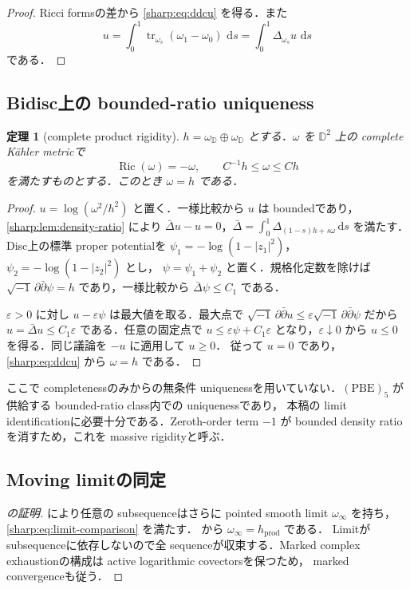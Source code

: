 \documentclass[a4paper,11pt]{ltjsarticle}
\numberwithin{equation}{section}
\theoremstyle{plain}
\newtheorem{theorem}{定理}[section]
\theoremstyle{definition}
\theoremstyle{remark}
\newcommand{\eps}{\varepsilon}\newcommand{\dd}{\,\mathrm d}\newcommand{\ddc}{\sqrt{-1}\,\partial\bar\partial}
\newcommand{\Ric}{\operatorname{Ric}}\newcommand{\tr}{\operatorname{tr}}\newcommand{\osc}{\operatorname{osc}}\newcommand{\vol}{\operatorname{Vol}}
\begin{document}
\begin{proof}
Ricci formsの差から \eqref{sharp:eq:ddcu} を得る．また
\[
 u=\int_0^1\tr_{\omega_s}(\omega_1-\omega_0)\,\dd s
  =\int_0^1\Delta_{\omega_s}u\,\dd s
\]
である．
\end{proof}

\subsection{Bidisc上の bounded-ratio uniqueness}

\begin{theorem}[complete product rigidity]\label{sharp:thm:complete-product-rigidity}
$h=\omega_{\mathbb D}\oplus\omega_{\mathbb D}$ とする．$\omega$ を $\mathbb D^2$ 上の complete Kähler metricで
\[
 \Ric(\omega)=-\omega,\qquad C^{-1}h\le\omega\le Ch
\]
を満たすものとする．このとき $\omega=h$ である．
\end{theorem}

\begin{proof}
$u=\log(\omega^2/h^2)$ と置く．一様比較から $u$ は boundedであり，\cref{sharp:lem:density-ratio} により
$\bar\Delta u-u=0$，$\bar\Delta=\int_0^1\Delta_{(1-s)h+s\omega}\dd s$ を満たす．
Disc上の標準 proper potentialを $\psi_1=-\log(1-|z_1|^2)$，$\psi_2=-\log(1-|z_2|^2)$ とし，
$\psi=\psi_1+\psi_2$ と置く．規格化定数を除けば $\ddc\psi=h$ であり，一様比較から
$\bar\Delta\psi\le C_1$ である．

$\eps>0$ に対し $u-\eps\psi$ は最大値を取る．最大点で $\ddc u\le\eps\ddc\psi$ だから
$u=\bar\Delta u\le C_1\eps$ である．任意の固定点で
$u\le\eps\psi+C_1\eps$ となり，$\eps\downarrow0$ から $u\le0$ を得る．同じ議論を $-u$ に適用して $u\ge0$．
従って $u=0$ であり，\eqref{sharp:eq:ddcu} から $\omega=h$ である．
\end{proof}

\begin{remark}
ここで completenessのみからの無条件 uniquenessを用いていない．$\mathrm{(PBE)}_5$ が供給する bounded-ratio class内での uniquenessであり，
本稿の limit identificationに必要十分である．Zeroth-order term $-1$ が bounded density ratioを消すため，これを massive rigidityと呼ぶ．
\end{remark}

\subsection{Moving limitの同定}

\begin{proof}[ の証明]
 により任意の subsequenceはさらに pointed smooth limit $\omega_\infty$ を持ち，
\eqref{sharp:eq:limit-comparison} を満たす． から $\omega_\infty=h_{\mathrm{prod}}$ である．
Limitが subsequenceに依存しないので全 sequenceが収束する．Marked complex exhaustionの構成は active logarithmic covectorsを保つため，
marked convergenceも従う．
\end{proof}
\end{document}
